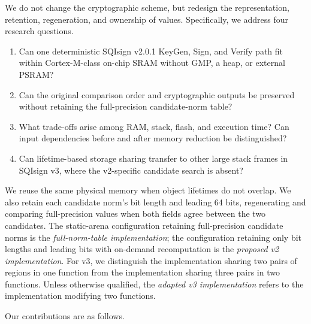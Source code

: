 \documentclass[a4paper,10pt]{article}
\theoremstyle{definition}
\theoremstyle{remark}
\begin{document}
We do not change the cryptographic scheme, but redesign the representation, retention, regeneration, and ownership of values. Specifically, we address four research questions.

\begin{enumerate}[label=Q\arabic*.,leftmargin=3em]
  \item Can one deterministic SQIsign v2.0.1 KeyGen, Sign, and Verify path fit within Cortex-M-class on-chip SRAM without GMP, a heap, or external PSRAM?
  \item Can the original comparison order and cryptographic outputs be preserved without retaining the full-precision candidate-norm table?
  \item What trade-offs arise among RAM, stack, flash, and execution time? Can input dependencies before and after memory reduction be distinguished?
  \item Can lifetime-based storage sharing transfer to other large stack frames in SQIsign v3, where the v2-specific candidate search is absent?
\end{enumerate}

We reuse the same physical memory when object lifetimes do not overlap. We also retain each candidate norm's bit length and leading 64 bits, regenerating and comparing full-precision values when both fields agree between the two candidates. The static-arena configuration retaining full-precision candidate norms is the \emph{full-norm-table implementation}; the configuration retaining only bit lengths and leading bits with on-demand recomputation is the \emph{proposed v2 implementation}. For v3, we distinguish the implementation sharing two pairs of regions in one function from the implementation sharing three pairs in two functions. Unless otherwise qualified, the \emph{adapted v3 implementation} refers to the implementation modifying two functions.

Our contributions are as follows.
\end{document}
